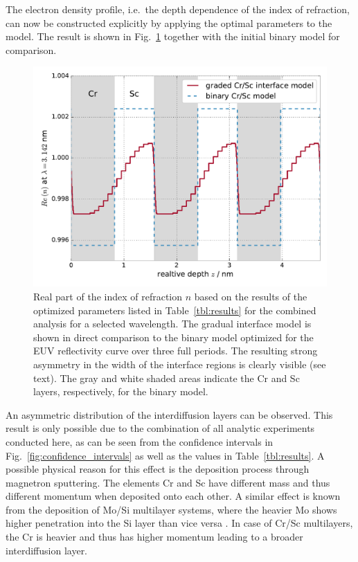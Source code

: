 The electron density profile, i.e.~the depth dependence of the index of refraction, can now be constructed explicitly by applying the optimal parameters to the model. The result is shown in Fig.~\ref{fig:electron_density_profile} together with the initial binary model for comparison.
\begin{figure}
  \centering
  \includegraphics[width=\textwidth]{img/im_cr_sc_multilayer/real_model}
  \caption{Real part of the index of refraction $n$  based on the results of the optimized parameters listed in Table~\ref{tbl:results} for the combined analysis for a selected wavelength. The gradual interface model is shown in direct comparison to the binary model optimized for the EUV reflectivity curve over three full periods. The resulting strong asymmetry in the width of the interface regions is clearly visible (see text). The gray and white shaded areas indicate the Cr and Sc layers, respectively, for the binary model.}
  \label{fig:electron_density_profile}
\end{figure}
An asymmetric distribution of the interdiffusion layers can be observed. This result is only possible due to the combination of all analytic experiments conducted here, as can be seen from the confidence intervals in Fig.~\ref{fig:confidence_intervals} as well as the values in Table~\ref{tbl:results}. A possible physical reason for this effect is the deposition process through magnetron sputtering. The elements Cr and Sc have different mass and thus different momentum when deposited onto each other. A similar effect is known from the deposition of Mo/Si multilayer systems, where the heavier Mo shows higher penetration into the Si layer than vice versa \cite{mosi_asymmetry}. In case of Cr/Sc multilayers, the Cr is heavier and thus has higher momentum leading to a broader interdiffusion layer.
